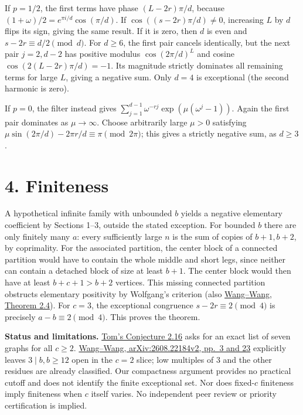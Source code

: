 \documentclass[11pt]{article}
\begin{document}
If \(p=1/2\), the first terms have phase \((L-2r)\pi/d\), because
\((1+\omega)/2=e^{\pi i/d}\cos(\pi/d)\). If \(\cos((s-2r)\pi/d)\ne0\),
increasing \(L\) by \(d\) flips its sign, giving the same result. If it
is zero, then \(d\) is even and \(s-2r\equiv d/2\pmod d\). For
\(d\ge6\), the first pair cancels identically, but the next pair
\(j=2,d-2\) has positive modulus \(\cos(2\pi/d)^L\) and cosine
\(\cos(2(L-2r)\pi/d)=-1\). Its magnitude strictly dominates all
remaining terms for large \(L\), giving a negative sum. Only \(d=4\) is
exceptional (the second harmonic is zero).

If \(p=0\), the filter instead gives
\(\sum_{j=1}^{d-1}\omega^{-rj}\exp(\mu(\omega^j-1))\). Again the first
pair dominates as \(\mu\to\infty\). Choose arbitrarily large \(\mu>0\)
satisfying \(\mu\sin(2\pi/d)-2\pi r/d\equiv\pi\pmod{2\pi}\); this gives
a strictly negative sum, as \(d\ge3\).

\section*{4. Finiteness}\label{finiteness}

A hypothetical infinite family with unbounded \(b\) yields a negative
elementary coefficient by Sections 1--3, outside the stated exception.
For bounded \(b\) there are only finitely many \(a\): every sufficiently
large \(n\) is the sum of copies of \(b+1,b+2\), by coprimality. For the
associated partition, the center block of a connected partition would
have to contain the whole middle and short legs, since neither can
contain a detached block of size at least \(b+1\). The center block
would then have at least \(b+c+1>b+2\) vertices. This missing connected
partition obstructs elementary positivity by Wolfgang's criterion (also
\href{https://arxiv.org/pdf/2112.06619}{Wang--Wang, Theorem 2.4}). For
\(c=3\), the exceptional congruence \(s-2r\equiv2\pmod4\) is precisely
\(a-b\equiv2\pmod4\). This proves the theorem.

\textbf{Status and limitations.}
\href{https://www.mat.univie.ac.at/~slc/wpapers/FPSAC2025/118.pdf}{Tom's
Conjecture 2.16} asks for an exact list of seven graphs for all
\(c\ge2\). \href{https://arxiv.org/pdf/2608.22184}{Wang--Wang,
arXiv:2608.22184v2, pp.~3 and 23} explicitly leaves \(3\mid b, b\ge12\)
open in the \(c=2\) slice; low multiples of 3 and the other residues are
already classified. Our compactness argument provides no practical
cutoff and does not identify the finite exceptional set. Nor does
fixed-\(c\) finiteness imply finiteness when \(c\) itself varies. No
independent peer review or priority certification is implied.
\end{document}
